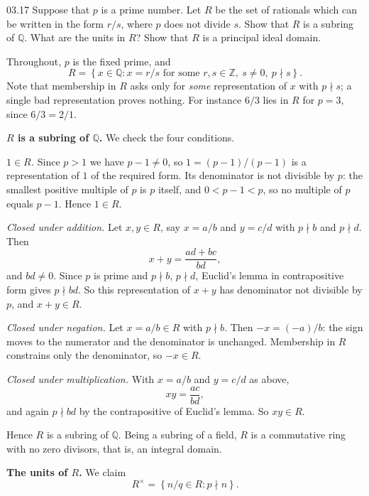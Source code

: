 \documentclass[11pt]{article}
\begin{document}
\begin{problem}{03.17}
  Suppose that $p$ is a prime number. Let $R$ be the set of rationals which can
  be written in the form $r/s$, where $p$ does not divide $s$. Show that $R$ is
  a subring of $\mathbb{Q}$. What are the units in $R$? Show that $R$ is a
  principal ideal domain.
\end{problem}
\begin{solution}
  Throughout, $p$ is the fixed prime, and
  \[
    R = \left\{ x \in \mathbb{Q} : x = r/s \text{ for some }
    r,s \in \mathbb{Z},\ s \neq 0,\ p \nmid s \right\} .
  \]
  Note that membership in $R$ asks only for \emph{some} representation of $x$
  with $p \nmid s$; a single bad representation proves nothing. For instance
  $6/3$ lies in $R$ for $p = 3$, since $6/3 = 2/1$.

  \medskip
  \textbf{$R$ is a subring of $\mathbb{Q}$.} We check the four conditions.

  \emph{$1 \in R$.} Since $p > 1$ we have $p - 1 \neq 0$, so $1 = (p-1)/(p-1)$
  is a representation of $1$ of the required form. Its denominator is not
  divisible by $p$: the smallest positive multiple of $p$ is $p$ itself, and
  $0 < p-1 < p$, so no multiple of $p$ equals $p-1$. Hence $1 \in R$.

  \emph{Closed under addition.} Let $x, y \in R$, say $x = a/b$ and $y = c/d$
  with $p \nmid b$ and $p \nmid d$. Then
  \[
    x + y = \frac{ad + bc}{bd},
  \]
  and $bd \neq 0$. Since $p$ is prime and $p \nmid b$, $p \nmid d$, Euclid's
  lemma in contrapositive form gives $p \nmid bd$. So this representation of
  $x+y$ has denominator not divisible by $p$, and $x + y \in R$.

  \emph{Closed under negation.} Let $x = a/b \in R$ with $p \nmid b$. Then
  $-x = (-a)/b$: the sign moves to the numerator and the denominator is
  unchanged. Membership in $R$ constrains only the denominator, so
  $-x \in R$.

  \emph{Closed under multiplication.} With $x = a/b$ and $y = c/d$ as above,
  \[
    xy = \frac{ac}{bd},
  \]
  and again $p \nmid bd$ by the contrapositive of Euclid's lemma. So
  $xy \in R$.

  Hence $R$ is a subring of $\mathbb{Q}$. Being a subring of a field, $R$ is
  a commutative ring with no zero divisors, that is, an integral domain.

  \medskip
  \textbf{The units of $R$.} We claim
  \[
    R^{\times} = \left\{ n/q \in R : p \nmid n \right\} .
  \]


\end{solution}
\end{document}
